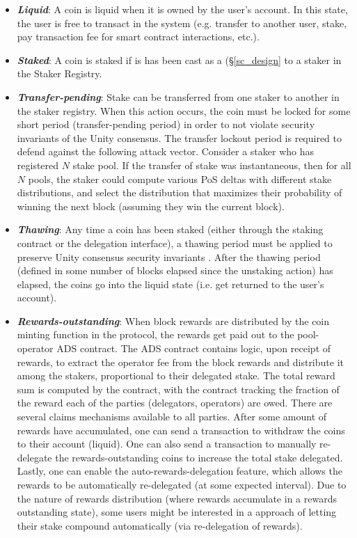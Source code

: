 \begin{itemize}
    \item \textbf{\textit{Liquid}}: A coin is liquid when it is owned by the user's account. In this state, the user is free to transact in the system (e.g. transfer to another user, stake, pay transaction fee for smart contract interactions, etc.).
    \item \textbf{\textit{Staked}}: A coin is staked if is has been cast as a  (\S\ref{sc_design} to a staker in the Staker Registry. 
    \item \textbf{\textit{Transfer-pending}}: Stake can be transferred from one staker to another in the staker registry. When this action occurs, the coin must be locked for some short period (transfer-pending period) in order to not violate security invariants of the Unity consensus. The transfer lockout period is required to defend against the following attack vector. Consider a staker who has registered $N$ stake pool. If the transfer of stake was instantaneous, then for all $N$ pools, the staker could compute various PoS  deltas with different stake distributions, and select the distribution that maximizes their probability of winning the next block (assuming they win the current block).  
    \item \textbf{\textit{Thawing}}: Any time a coin has been staked (either through the staking contract or the delegation interface), a thawing period must be applied to preserve Unity consensus security invariants \cite{WZS19}. After the thawing period (defined in some number of blocks elapsed since the unstaking action) has elapsed, the coins go into the liquid state (i.e. get returned to the user's account). 
    \item \textbf{\textit{Rewards-outstanding}}: When block rewards are distributed by the coin minting function in the protocol, the rewards get paid out to the pool-operator ADS contract. The ADS contract contains logic, upon receipt of rewards, to extract the operator fee from the block rewards and distribute it among the stakers, proportional to their delegated stake. The total reward sum is computed by the contract, with the contract tracking the fraction of the reward each of the parties (delegators, operators) are owed. There are several claims mechanisms available to all parties. After some amount of rewards have accumulated, one can send a transaction to withdraw the coins to their account (liquid). One can also send a transaction to manually re-delegate the rewards-outstanding coins to increase the total stake delegated. Lastly, one can enable the auto-rewards-delegation feature, which allows the rewards to be automatically re-delegated (at some expected interval). Due to the nature of rewards distribution (where rewards accumulate in a rewards outstanding state), some users might be interested in a  approach of letting their stake compound automatically (via re-delegation of rewards).
\end{itemize}

